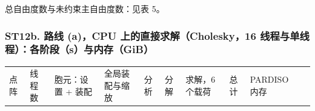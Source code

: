 \documentclass[preprint,12pt,authoryear]{elsarticle}
\begin{document}
总自由度数与未约束主自由度数：见表 5。

\subsubsection{ST12b. 路线 (a)，CPU 上的直接求解（Cholesky，16 线程与单线程）：各阶段（s）与内存（GiB）}

{\scriptsize
\begin{longtable}[]{@{}
  >{\raggedright\arraybackslash}p{}
  >{\raggedleft\arraybackslash}p{}
  >{\raggedright\arraybackslash}p{}
  >{\raggedright\arraybackslash}p{}
  >{\raggedright\arraybackslash}p{}
  >{\raggedright\arraybackslash}p{}
  >{\raggedright\arraybackslash}p{}
  >{\raggedright\arraybackslash}p{}
  >{\raggedright\arraybackslash}p{}
  >{\raggedright\arraybackslash}p{}@{}}
\toprule\noalign{}
\begin{minipage}[b]{\linewidth}\raggedright
点阵
\end{minipage} & \begin{minipage}[b]{\linewidth}\raggedleft
线程数
\end{minipage} & \begin{minipage}[b]{\linewidth}\raggedright
胞元：设置 + 装配
\end{minipage} & \begin{minipage}[b]{\linewidth}\raggedright
全局装配与缩放
\end{minipage} & \begin{minipage}[b]{\linewidth}\raggedright
分析
\end{minipage} & \begin{minipage}[b]{\linewidth}\raggedright
分解
\end{minipage} & \begin{minipage}[b]{\linewidth}\raggedright
求解，6 个载荷
\end{minipage} & \begin{minipage}[b]{\linewidth}\raggedright
总计
\end{minipage} & \begin{minipage}[b]{\linewidth}\raggedright
PARDISO 内存
\end{minipage} & \begin{minipage}[b]{\linewidth}\raggedright

\end{minipage}
\end{longtable}}
\end{document}

